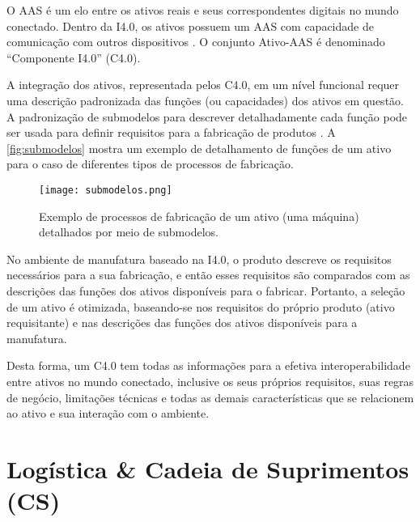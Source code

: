 O AAS é um elo entre os ativos reais e seus correspondentes digitais no mundo conectado. Dentro da I4.0, os ativos possuem um AAS com capacidade de comunicação com outros dispositivos \cite{bader2019aas}. O conjunto Ativo-AAS é denominado ``Componente I4.0'' (C4.0).%


A integração dos ativos, representada pelos C4.0, em um nível funcional requer uma descrição padronizada das funções (ou capacidades) dos ativos em questão. A padronização de submodelos para descrever detalhadamente cada função pode ser usada para definir requisitos para a fabricação de produtos \cite{bedenbender2017aasexamples}. A \autoref{fig:submodelos} mostra um exemplo de detalhamento de funções de um ativo para o caso de diferentes tipos de processos de fabricação.

\begin{figure}[htb]
	\centering
	\texttt{[image: submodelos.png]}
	\caption{Exemplo de processos de fabricação de um ativo (uma máquina) detalhados por meio de submodelos.}
	\label{fig:submodelos}
\end{figure}

No ambiente de manufatura baseado na I4.0, o produto descreve os requisitos necessários para a sua fabricação, e então esses requisitos são comparados com as descrições das funções dos ativos disponíveis para o fabricar. Portanto, a seleção de um ativo é otimizada, baseando-se nos requisitos do próprio produto (ativo requisitante) e nas descrições das funções dos ativos disponíveis para a manufatura.

Desta forma, um C4.0 tem todas as informações para a efetiva interoperabilidade entre ativos no mundo conectado, inclusive os seus próprios requisitos, suas regras de negócio, limitações técnicas e todas as demais características que se relacionem ao ativo e sua interação com o ambiente.

\section{Logística \& Cadeia de Suprimentos (CS)}
\label{sec:logistica}

